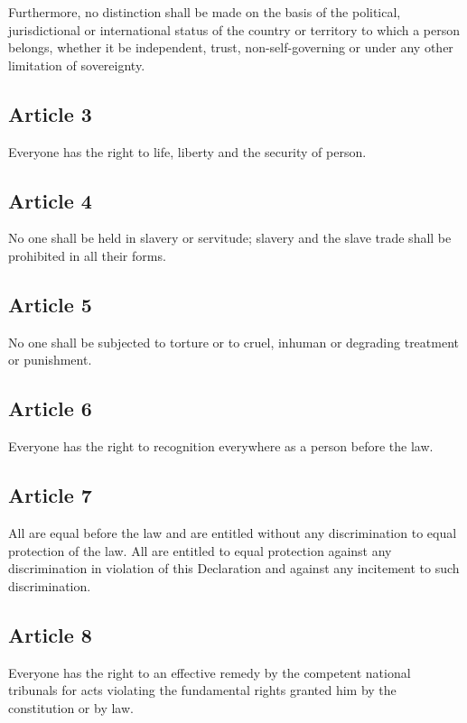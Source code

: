\documentclass[
  titlepage,
  openright,
  DIV=calc,
  toc=listof,
  listof=nochaptergap]{scrbook}
\begin{document}
Furthermore, no distinction shall be made on the basis of the political,
jurisdictional or international status of the country or territory to
which a person belongs, whether it be independent, trust,
non-self-governing or under any other limitation of sovereignty.

\subsection{Article 3}\label{article-3-3}

Everyone has the right to life, liberty and the security of person.

\subsection{Article 4}\label{article-4-3}

No one shall be held in slavery or servitude; slavery and the slave
trade shall be prohibited in all their forms.

\subsection{Article 5}\label{article-5-3}

No one shall be subjected to torture or to cruel, inhuman or degrading
treatment or punishment.

\subsection{Article 6}\label{article-6-3}

Everyone has the right to recognition everywhere as a person before the
law.

\subsection{Article 7}\label{article-7-3}

All are equal before the law and are entitled without any discrimination
to equal protection of the law. All are entitled to equal protection
against any discrimination in violation of this Declaration and against
any incitement to such discrimination.

\subsection{Article 8}\label{article-8-3}

Everyone has the right to an effective remedy by the competent national
tribunals for acts violating the fundamental rights granted him by the
constitution or by law.
\end{document}
